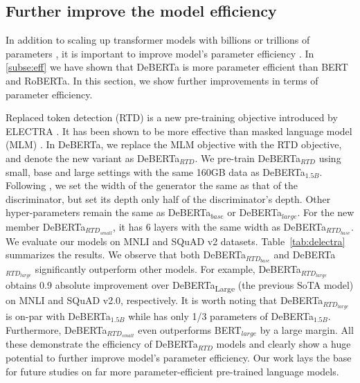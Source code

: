 \subsection{Further improve the model efficiency}
In addition to scaling up transformer models with billions or trillions of parameters \citep{raffel2019t5,brown2020language,fedus2021switch}, it is important to improve model's parameter efficiency \citep{Kanakarajan2021SmallBenchNB}. In \ref{subse:eff} we have shown that DeBERTa is more parameter efficient than BERT and RoBERTa. 
In this section, we show further improvements in terms of parameter efficiency.

Replaced token detection (RTD) is a new pre-training objective introduced by ELECTRA \citep{clark2020electra}. It has been shown to be more effective than masked language model (MLM)  \citep{devlin2018bert, liu2019roberta}. 
In DeBERTa, we replace the MLM objective with the RTD objective, and denote the new variant as DeBERTa$_{RTD}$. 
We pre-train DeBERTa$_{RTD}$ using small, base and large settings with the same 160GB data as DeBERTa$_{1.5B}$. Following \citep{meng2021coco}, we set the width of the generator the same as that of the discriminator, but set its depth only half of the  discriminator's depth. 
Other hyper-parameters remain the same as DeBERTa$_{base}$ or DeBERTa$_{large}$. For the new member DeBERTa$_{RTD_{small}}$, it has 6 layers with the same width as DeBERTa$_{RTD_{base}}$. We evaluate our models on MNLI and SQuAD v2 datasets.
Table~\ref{tab:delectra} summarizes the results.
We observe that both DeBERTa$_{RTD_{base}}$ and DeBERTa$_{RTD_{large}}$ significantly outperform other models. For example, DeBERTa$_{RTD_{large}}$ obtains 0.9 absolute improvement over DeBERTa\textsubscript{Large} (the previous SoTA model) on MNLI and SQuAD v2.0, respectively.
It is worth noting that DeBERTa$_{RTD_{large}}$ is on-par with DeBERTa$_{1.5B}$ while has only 1/3 parameters of DeBERTa$_{1.5B}$.
Furthermore, DeBERTa$_{RTD_{small}}$ even outperforms BERT$_{large}$ by a large margin.
All these demonstrate the efficiency of DeBERTa$_{RTD}$ models and clearly show a huge potential to further improve model's parameter efficiency. Our work lays the base for future studies on far more parameter-efficient pre-trained language models. %
